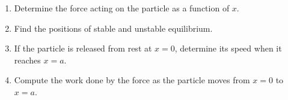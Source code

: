 \documentclass[../main.tex]{subfiles}
\begin{document}
\begin{enumerate}
\begin{enumerate}
    \item Determine the force acting on the particle as a function of $x$.
    \item Find the positions of stable and unstable equilibrium.
    \item If the particle is released from rest at $x = 0$, determine its speed when it reaches $x = a$.
    \item Compute the work done by the force as the particle moves from $x = 0$ to $x = a$.
\end{enumerate}

\end{enumerate}
\end{document}

